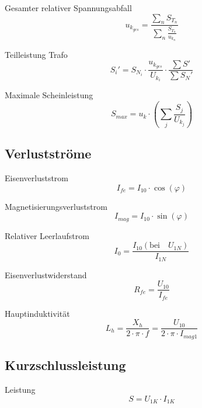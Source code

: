 \documentclass[11pt, a4paper, draft, fleqn, twocolumn]{article}
\numberwithin{equation}{subsection}
\begin{document}
\noindent Gesamter relativer Spannungsabfall
\begin{equation}
    u_{k_{ges}} = \frac{\sum_n S_{T_{n}}}{\sum_n \frac{S_{T_{n}}}{u_{k_{n}}}}
\end{equation}

\noindent Teilleistung Trafo
\begin{equation}
    S_i' = S_{N_{i}} \cdot \frac{u_{k_{ges}}}{U_{k_{i}}} \cdot \frac{\sum S'}{\sum S_N'}
\end{equation}

\noindent Maximale Scheinleistung
\begin{equation}
    S_{max} = u_k \cdot \left(\sum_j \frac{S_j}{U_{k_{j}}} \right)
\end{equation}


\subsection{Verlustströme}

Eisenverluststrom
\begin{equation}
    I_{fe} = I_{10} \cdot \cos(\varphi)
\end{equation}

\noindent Magnetisierungsverluststrom
\begin{equation}
    I_{mag} = I_{10} \cdot \sin(\varphi)
\end{equation}

\noindent Relativer Leerlaufstrom
\begin{equation}
    I_0 = \frac{I_{10} (\text{bei} \quad U_{1N})}{I_{1N}}
\end{equation}

\noindent Eisenverlustwiderstand
\begin{equation}
    R_{fe} = \frac{U_{10}}{I_{fe}}
\end{equation}

\noindent Hauptinduktivität
\begin{equation}
    L_h = \frac{X_h}{2 \cdot \pi \cdot f} = \frac{U_{10}}{2 \cdot \pi \cdot I_{mag1}}
\end{equation}


\subsection{Kurzschlussleistung}

Leistung
\begin{equation}
    S = U_{1K} \cdot I_{1K}
\end{equation}
\end{document}
